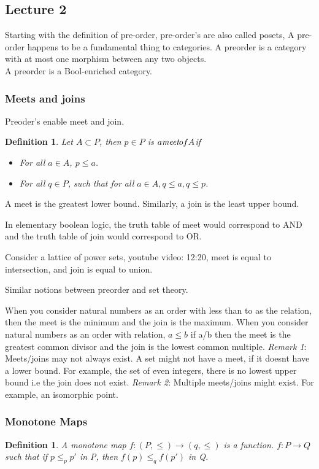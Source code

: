 \documentclass{article}
\newtheorem{defn}[thm]{Definition} %
\begin{document}
\subsection{Lecture 2}
Starting with the definition of pre-order, pre-order's are also called posets, A pre-order happens to be a fundamental thing to categories. 
A preorder is a category with at most one morphism between any two objects.
\\
A preorder is a Bool-enriched category. 
\subsubsection{Meets and joins}
Preoder's enable meet and join. 
\begin{defn}
Let $A \subset P$, then $p \in P$ is $a \emph{meet} of A $if
 \begin{itemize}
     \item For all $a \in A$, $p \leq a$. \\
     \item For all $q \in P$, such that for all $a \in A, q \leq a, q \leq p$. \\ 
\end{itemize}
\end{defn}
A meet is the greatest lower bound. Similarly, a join is the least upper bound. 

In elementary boolean logic, the truth table of meet would correspond to AND and the truth table of join would correspond to OR. 

Consider a lattice of power sets, {youtube video: 12:20}, meet is equal to intersection, and join is equal to union. 

Similar notions between preorder and set theory.

When you consider natural numbers as an order with less than to as the relation, then the meet is the minimum and the join is the maximum. When you consider natural numbers as an order with relation, $a \leq b$ if a/b then the meet is the greatest common divisor and the join is the lowest common multiple. 
\newline
\emph{Remark 1}:  Meets/joins may not always exist. A set might not have a meet, if it doesnt have a lower bound. For example, the set of even integers, there is no lowest upper bound i.e the join does not exist. 
\newline
\emph{Remark 2}: Multiple meets/joins might exist. For example, an isomorphic point.  

\subsubsection{Monotone Maps}
\begin{defn}
A monotone map $f: (P, \leq) \rightarrow (q, \leq)$ is a function. 
       $f: P \rightarrow Q$
      such that if $p \leq_p p'$ in P, then $f(p) \leq_q f(p')$ in Q.
\end{defn}
\end{document}
